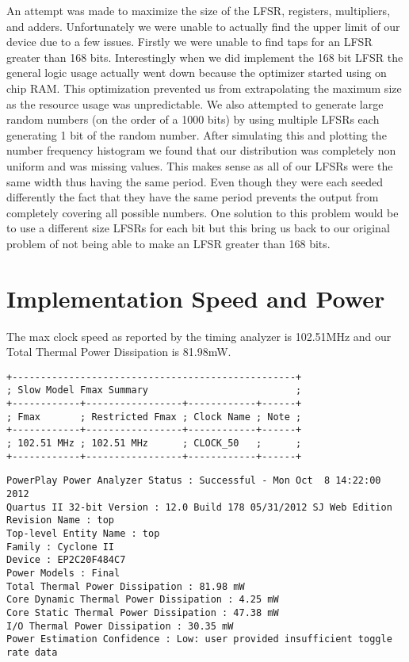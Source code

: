 \documentclass[12pt]{article}
\begin{document}
An attempt was made to maximize the size of the LFSR, registers, multipliers, and adders. Unfortunately we were unable to actually find the upper limit of our device due to a few issues. Firstly we were unable to find taps for an LFSR greater than 168 bits. Interestingly when we did implement the 168 bit LFSR the general logic usage actually went down because the optimizer started using on chip RAM. This optimization prevented us from extrapolating the maximum size as the resource usage was unpredictable. We also attempted to generate large random numbers (on the order of a 1000 bits) by using multiple LFSRs each generating 1 bit of the random number. After simulating this and plotting the number frequency histogram we found that our distribution was completely non uniform and was missing values. This makes sense as all of our LFSRs were the same width thus having the same period. Even though they were each seeded differently the fact that they have the same period prevents the output from completely covering all possible numbers. One solution to this problem would be to use a different size LFSRs for each bit but this bring us back to our original problem of not being able to make an LFSR greater than 168 bits. 


\section*{Implementation Speed and Power}


The max clock speed as reported by the timing analyzer is 102.51MHz and our Total Thermal Power Dissipation is 81.98mW.


\begin{verbatim}
+--------------------------------------------------+
; Slow Model Fmax Summary                          ;
+------------+-----------------+------------+------+
; Fmax       ; Restricted Fmax ; Clock Name ; Note ;
+------------+-----------------+------------+------+
; 102.51 MHz ; 102.51 MHz      ; CLOCK_50   ;      ;
+------------+-----------------+------------+------+
\end{verbatim}

\newpage
\begin{verbatim}
PowerPlay Power Analyzer Status : Successful - Mon Oct  8 14:22:00 2012
Quartus II 32-bit Version : 12.0 Build 178 05/31/2012 SJ Web Edition
Revision Name : top
Top-level Entity Name : top
Family : Cyclone II
Device : EP2C20F484C7
Power Models : Final
Total Thermal Power Dissipation : 81.98 mW
Core Dynamic Thermal Power Dissipation : 4.25 mW
Core Static Thermal Power Dissipation : 47.38 mW
I/O Thermal Power Dissipation : 30.35 mW
Power Estimation Confidence : Low: user provided insufficient toggle rate data
\end{verbatim}
\end{document}
